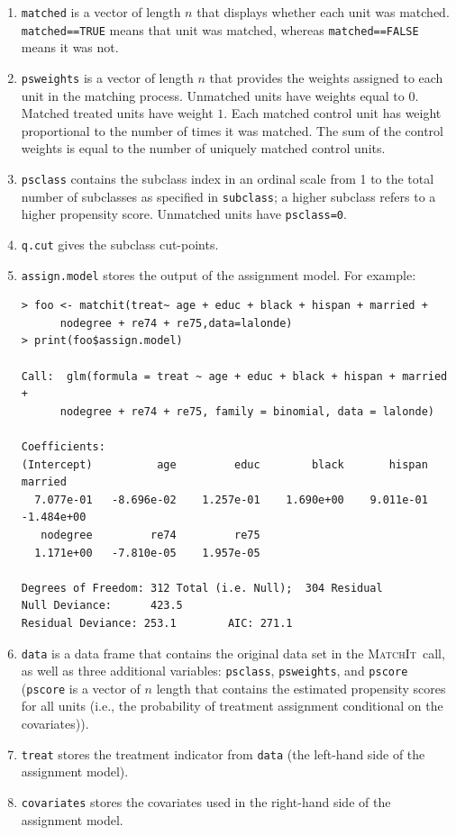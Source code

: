 \documentclass[oneside,letterpaper,titlepage]{article}
\newcommand{\MatchIt}{\textsc{MatchIt}}
\begin{document}
\begin{enumerate}
 \item \texttt{matched} is a vector of length $n$ that displays
   whether each unit was matched.  \texttt{matched==TRUE} means that
   unit was matched, whereas \texttt{matched==FALSE} means it was not.
   
 \item \texttt{psweights} is a vector of length $n$ that provides the
   weights assigned to each unit in the matching process.  Unmatched
   units have weights equal to $0$. Matched treated units have weight
   $1$.  Each matched control unit has weight proportional to the
   number of times it was matched.  The sum of the control weights is
   equal to the number of uniquely matched control units.
   
 \item \texttt{psclass} contains the subclass index in an ordinal
   scale from 1 to the total number of subclasses as specified in
   \texttt{subclass}; a higher subclass refers to a higher propensity
   score.  Unmatched units have \texttt{psclass=0}.
   
 \item \texttt{q.cut} gives the subclass cut-points.
   
 \item \texttt{assign.model} stores the output of the assignment
   model.  For example:
  
  \begin{footnotesize}
\begin{verbatim}
> foo <- matchit(treat~ age + educ + black + hispan + married +
      nodegree + re74 + re75,data=lalonde)
> print(foo$assign.model)

Call:  glm(formula = treat ~ age + educ + black + hispan + married +
      nodegree + re74 + re75, family = binomial, data = lalonde) 

Coefficients:
(Intercept)          age         educ        black       hispan      married  
  7.077e-01   -8.696e-02    1.257e-01    1.690e+00    9.011e-01   -1.484e+00  
   nodegree         re74         re75  
  1.171e+00   -7.810e-05    1.957e-05  

Degrees of Freedom: 312 Total (i.e. Null);  304 Residual
Null Deviance:      423.5 
Residual Deviance: 253.1        AIC: 271.1 
\end{verbatim}
\end{footnotesize}

\item \texttt{data} is a data frame that contains the original data
  set in the \MatchIt\ call, as well as three additional variables:
  \texttt{psclass}, \texttt{psweights}, and \texttt{pscore}
  (\texttt{pscore} is a vector of $n$ length that contains the
  estimated propensity scores for all units (i.e., the probability of
  treatment assignment conditional on the covariates)).
  
\item \texttt{treat} stores the treatment indicator from \texttt{data}
  (the left-hand side of the assignment model).
  
\item \texttt{covariates} stores the covariates used in the right-hand
  side of the assignment model.
\end{enumerate}
\end{document}
